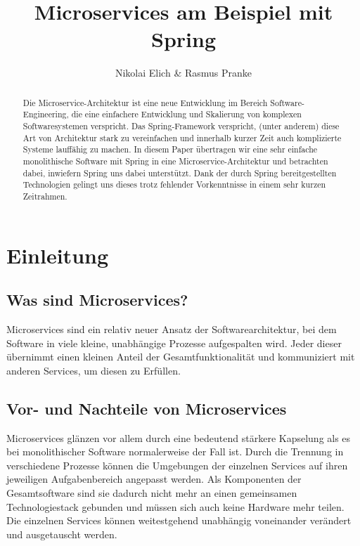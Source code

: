 \documentclass{article}
\author{Nikolai Elich & Rasmus Pranke}
\title{Microservices am Beispiel mit Spring}
\begin{document}
\maketitle

\begin{abstract}
Die Microservice-Architektur ist eine neue Entwicklung im Bereich Software-Engineering, die eine einfachere Entwicklung und Skalierung von komplexen Softwaresystemen verspricht.
Das Spring-Framework verspricht, (unter anderem) diese Art von Architektur stark zu vereinfachen und innerhalb kurzer Zeit auch komplizierte Systeme lauffähig zu machen.
In diesem Paper übertragen wir eine sehr einfache monolithische Software mit Spring in eine Microservice-Architektur und betrachten dabei, inwiefern Spring uns dabei unterstützt.
Dank der durch Spring bereitgestellten Technologien gelingt uns dieses trotz fehlender Vorkenntnisse in einem sehr kurzen Zeitrahmen.
\end{abstract}

\pagebreak

\tableofcontents

\pagebreak

\section{Einleitung}

\subsection{Was sind Microservices?}

Microservices sind ein relativ neuer Ansatz der Softwarearchitektur, bei dem Software in viele kleine, unabhängige Prozesse aufgespalten wird.
Jeder dieser übernimmt einen kleinen Anteil der Gesamtfunktionalität und kommuniziert mit anderen Services, um diesen zu Erfüllen.\cite{OMA}

\subsection{Vor- und Nachteile von Microservices}

Microservices glänzen vor allem durch eine bedeutend stärkere Kapselung als es bei monolithischer Software normalerweise der Fall ist.
Durch die Trennung in verschiedene Prozesse können die Umgebungen der einzelnen Services auf ihren jeweiligen Aufgabenbereich angepasst werden.
Als Komponenten der Gesamtsoftware sind sie dadurch nicht mehr an einen gemeinsamen Technologiestack gebunden und müssen sich auch keine Hardware mehr teilen.
Die einzelnen Services können weitestgehend unabhängig voneinander verändert und ausgetauscht werden.\cite{EMMA}
\end{document}
